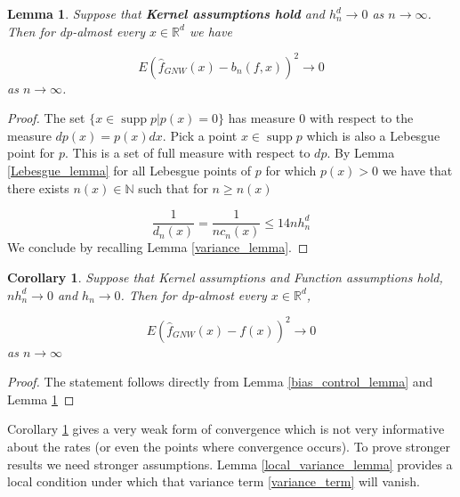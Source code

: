 \documentclass{article}
\newtheorem{lemma}[theorem]{Lemma}
\newtheorem{corollary}[theorem]{Corollary}
\DeclareMathOperator\supp{supp}
\begin{document}
\begin{lemma}
\label{pointwise_as_conv}
Suppose that \textbf{Kernel assumptions hold} and $h_n^d\to 0$ as $n\to\infty$. Then for dp-almost every $x\in\mathbb{R}^d$ we have

\begin{equation*}
    E(\hat{f}_{GNW}(x)-b_n(f,x))^2\to 0
\end{equation*}
as $n\to\infty$.

\end{lemma}
\begin{proof}
The set $\{x\in\supp{p}|p(x)=0\}$ has measure $0$ with respect to the measure $dp(x)=p(x)dx$. Pick a point $x\in\supp{p}$ which is also a Lebesgue point for $p$. This is a set of full measure with respect to $dp$. By Lemma \ref{Lebesgue_lemma} for all Lebesgue points of $p$ for which $p(x)>0$ we have that there exists $n(x)\in\mathbb{N}$ such that for $n\geq n(x)$

\begin{equation*}
    \frac{1}{d_n(x)}=\frac{1}{nc_n(x)}\leq {1}{4nh_n^d}
\end{equation*}
We conclude by recalling Lemma \ref{variance_lemma}.
\end{proof}

\begin{corollary}
\label{useless_corollary}
Suppose that Kernel assumptions and Function assumptions hold, $nh_n^d\to 0$ and $h_n\to 0$.
Then for dp-almost every $x\in\mathbb{R}^d$,

\begin{equation*}
    E(\hat{f}_{GNW}(x)-f(x))^2\to 0
\end{equation*}
as $n\to\infty$
\end{corollary}
\begin{proof}
The statement follows directly from Lemma \ref{bias_control_lemma} and Lemma \ref{pointwise_as_conv} 
\end{proof}
Corollary \ref{useless_corollary} gives a very weak form of convergence which is not very informative about the rates (or even the points where convergence occurs). To prove stronger results we need stronger assumptions. Lemma \ref{local_variance_lemma} provides a local condition under which  that variance term \ref{variance_term} will vanish.
\end{document}
